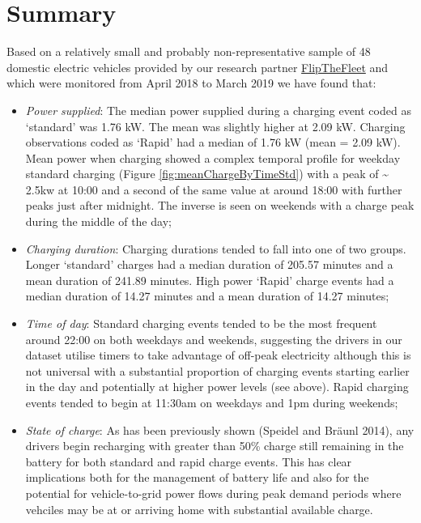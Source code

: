 \documentclass[]{article}
\providecommand{\tightlist}{%
  \setlength{\itemsep}{0pt}\setlength{\parskip}{0pt}}
\begin{document}
\hypertarget{summary}{%
\section{Summary}\label{summary}}

Based on a relatively small and probably non-representative sample of 48 domestic electric vehicles provided by our research partner \href{https://flipthefleet.org/}{FlipTheFleet} and which were monitored from April 2018 to March 2019 we have found that:

\begin{itemize}
\tightlist
\item
  \emph{Power supplied}: The median power supplied during a charging event coded as `standard' was 1.76 kW. The mean was slightly higher at 2.09 kW. Charging observations coded as `Rapid' had a median of 1.76 kW (mean = 2.09 kW). Mean power when charging showed a complex temporal profile for weekday standard charging (Figure \ref{fig:meanChargeByTimeStd}) with a peak of \textasciitilde{} 2.5kw at 10:00 and a second of the same value at around 18:00 with further peaks just after midnight. The inverse is seen on weekends with a charge peak during the middle of the day;
\item
  \emph{Charging duration}: Charging durations tended to fall into one of two groups. Longer `standard' charges had a median duration of 205.57 minutes and a mean duration of 241.89 minutes. High power `Rapid' charge events had a median duration of 14.27 minutes and a mean duration of 14.27 minutes;
\item
  \emph{Time of day}: Standard charging events tended to be the most frequent around 22:00 on both weekdays and weekends, suggesting the drivers in our dataset utilise timers to take advantage of off-peak electricity although this is not universal with a substantial proportion of charging events starting earlier in the day and potentially at higher power levels (see above). Rapid charging events tended to begin at 11:30am on weekdays and 1pm during weekends;
\item
  \emph{State of charge}: As has been previously shown (Speidel and Bräunl 2014), any drivers begin recharging with greater than 50\% charge still remaining in the battery for both standard and rapid charge events. This has clear implications both for the management of battery life and also for the potential for vehicle-to-grid power flows during peak demand periods where vehciles may be at or arriving home with substantial available charge.
\end{itemize}
\end{document}
